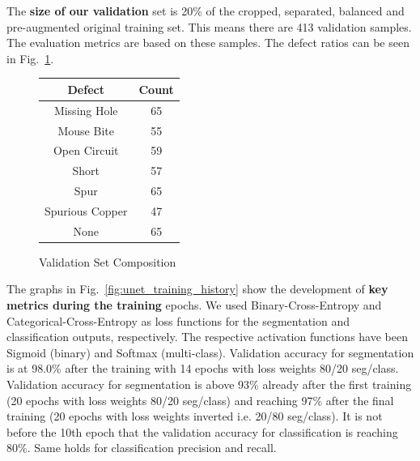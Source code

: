 \documentclass[12pt]{article}
\begin{document}
The {\bf size of our validation} set is 20\% of the cropped, separated, balanced and pre-augmented original training set. This means there are 413 validation samples. The evaluation metrics are based on these samples. The defect ratios can be seen in Fig.~\ref{fig:val_set}.
\begin{figure}[H]
    \begin{center}
        \begin{tabular}{|c|c|}
            \hline
            Defect & Count\\
            \hline
            Missing Hole & 65 \\
            Mouse Bite & 55 \\
            Open Circuit & 59 \\
            Short & 57 \\
            Spur & 65 \\
            Spurious Copper & 47 \\
            None & 65\\
            \hline
        \end{tabular}
    \end{center}
    \caption{Validation Set Composition}
    \label{fig:val_set}
\end{figure}

The graphs in Fig.~\ref{fig:unet_training_history} show the development of {\bf key metrics during the training} epochs. We used Binary-Cross-Entropy and Categorical-Cross-Entropy as loss functions for the segmentation and classification outputs, respectively. The respective activation functions have been Sigmoid (binary) and Softmax (multi-class). Validation accuracy for segmentation is at 98.0\% after the training with 14 epochs with loss weights 80/20 seg/class.
Validation accuracy for segmentation is above 93\% already after the first training (20 epochs with loss weights 80/20 seg/class) and reaching 97\% after the final training (20 epochs with loss weights inverted i.e. 20/80 seg/class). It is not before the 10th epoch that the validation accuracy for classification is reaching 80\%. Same holds for classification precision and recall.
\end{document}
